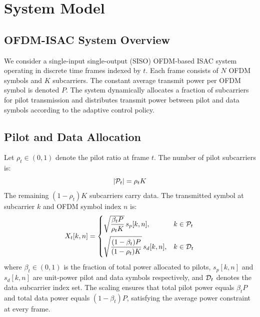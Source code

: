 \chapter{System Model}

\section{OFDM-ISAC System Overview}

We consider a single-input single-output (SISO) OFDM-based ISAC system operating in discrete time frames indexed by $t$. Each frame consists of $N$ OFDM symbols and $K$ subcarriers. The constant average transmit power per OFDM symbol is denoted $P$. The system dynamically allocates a fraction of subcarriers for pilot transmission and distributes transmit power between pilot and data symbols according to the adaptive control policy.


\section{Pilot and Data Allocation}

Let $\rho_t \in (0,1)$ denote the pilot ratio at frame $t$. The number of pilot subcarriers is:
\begin{equation}
    |\mathcal{P}_t| = \rho_t K
    \label{eq:pilot_count}
\end{equation}
The remaining $(1-\rho_t)K$ subcarriers carry data. The transmitted symbol at subcarrier $k$ and OFDM symbol index $n$ is:
\begin{equation}
    X_t[k,n] = \begin{cases}
        \sqrt{\dfrac{\beta_t P}{\rho_t K}}\, s_p[k,n], & k \in \mathcal{P}_t \\[10pt]
        \sqrt{\dfrac{(1-\beta_t)P}{(1-\rho_t)K}}\, s_d[k,n], & k \in \mathcal{D}_t
    \end{cases}
    \label{eq:tx_symbol}
\end{equation}
where $\beta_t \in (0,1)$ is the fraction of total power allocated to pilots, $s_p[k,n]$ and $s_d[k,n]$ are unit-power pilot and data symbols respectively, and $\mathcal{D}_t$ denotes the data subcarrier index set. The scaling ensures that total pilot power equals $\beta_t P$ and total data power equals $(1-\beta_t)P$, satisfying the average power constraint at every frame.


